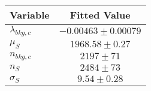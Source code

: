 \begin{tabular}[t]{lc}
\hline
Variable &Fitted Value\\
\hline\hline
$\lambda_{bkg,c}$&$-0.00463\pm0.00079$\\
\hline
$\mu_{S}$&$1968.58\pm0.27$\\
\hline
$n_{bkg,c}$&$2197\pm71$\\
\hline
$n_{S}$&$2484\pm73$\\
\hline
$\sigma_{S}$&$9.54\pm0.28$\\
\hline
\end{tabular}